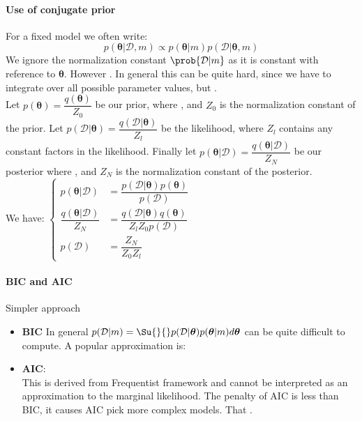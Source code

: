 \paragraph{Use of conjugate prior}
For a fixed model we often write:
$$p(\bm{\theta}|\mathcal{D},m) \propto p(\bm{\theta}|m)p(\mathcal{D}|\bm{\theta},m)$$
We ignore the normalization constant $\prob{\mathcal{D}|m}$ as it is constant with reference to
$\bm{\theta}$. However . In general this can
be quite hard, since we have to integrate over all possible parameter values, but .\\
Let $p(\bm{\theta})=\dfrac{q(\bm{\theta})}{Z_{0}}$ be our prior, where , and $Z_{0}$ is the normalization constant of the prior.
Let $p(\mathcal{D}|\bm{\theta})=\dfrac{q(\mathcal{D}|\bm{\theta})}{Z_{l}}$ be the 
likelihood, where $Z_{l}$ contains any constant factors in the likelihood. Finally let
$p(\bm{\theta}|\mathcal{D})=\dfrac{q(\bm{\theta}|\mathcal{D})}{Z_{N}}$ be our posterior
where , and $Z_{N}$ is the normalization constant of the posterior.\\
We have:
$
\begin{cases}
    p(\bm{\theta}|\mathcal{D}) &= \dfrac{p(\mathcal{D}|\bm{\theta})p(\bm{\theta})}{p(\mathcal{D})}\\
    \dfrac{q(\bm{\theta}|\mathcal{D})}{Z_{N}} &= \dfrac{q(\mathcal{D}|\bm{\theta})
	q(\bm{\theta})}{Z_{l}Z_{0}p(\mathcal{D})}\\
        p(\mathcal{D}) &= \dfrac{Z_{N}}{Z_{0}Z_{l}}
\end{cases}
$

 
\paragraph{BIC and AIC}
Simpler approach
\begin{itemize}
	\item \textbf{BIC} In general $p(\mathcal{D}|m) = \Su{}{}p(\mathcal{D}|\bm{\theta})p(\bm{\theta}|m)d\bm{
\theta}$ can be quite difficult to compute. A popular approximation is:
	\item \textbf{AIC}:
		\\
		This is derived from Frequentist framework and cannot be interpreted as 
		an approximation to the marginal likelihood. The penalty of AIC is less
		than BIC, it causes AIC pick more complex models. That .
\end{itemize}

